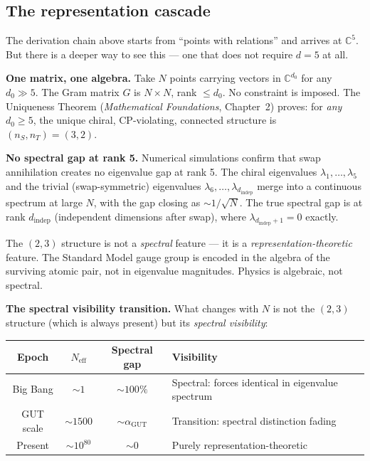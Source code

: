 \documentclass[12pt]{article}
\theoremstyle{remark}
\theoremstyle{definition}
\newcommand{\CC}{\mathbb{C}}
\begin{document}
\subsection{The representation cascade}

The derivation chain above starts from ``points with relations'' and arrives at $\CC^5$. But there is a deeper way to see this --- one that does not require $d = 5$ at all.

\textbf{One matrix, one algebra.} Take $N$ points carrying vectors in $\CC^{d_0}$ for any $d_0 \gg 5$. The Gram matrix $G$ is $N \times N$, rank $\leq d_0$. No constraint is imposed. The Uniqueness Theorem (\textit{Mathematical Foundations}, Chapter~2) proves: for \emph{any} $d_0 \geq 5$, the unique chiral, CP-violating, connected structure is $(n_S, n_T) = (3, 2)$.

\textbf{No spectral gap at rank 5.} Numerical simulations confirm that swap annihilation creates no eigenvalue gap at rank 5. The chiral eigenvalues $\lambda_1, \ldots, \lambda_5$ and the trivial (swap-symmetric) eigenvalues $\lambda_6, \ldots, \lambda_{d_\text{indep}}$ merge into a continuous spectrum at large $N$, with the gap closing as $\sim 1/\sqrt{N}$. The true spectral gap is at rank $d_\text{indep}$ (independent dimensions after swap), where $\lambda_{d_\text{indep}+1} = 0$ exactly.

The $(2,3)$ structure is not a \emph{spectral} feature --- it is a \emph{representation-theoretic} feature. The Standard Model gauge group is encoded in the algebra of the surviving atomic pair, not in eigenvalue magnitudes. Physics is algebraic, not spectral.

\textbf{The spectral visibility transition.} What changes with $N$ is not the $(2,3)$ structure (which is always present) but its \emph{spectral visibility}:

\begin{center}
\begin{tabular}{cccl}
\hline
Epoch & $N_\text{eff}$ & Spectral gap & Visibility \\
\hline
Big Bang & $\sim 1$ & $\sim 100\%$ & Spectral: forces identical in eigenvalue spectrum \\
GUT scale & $\sim 1500$ & $\sim \alpha_\text{GUT}$ & Transition: spectral distinction fading \\
Present & $\sim 10^{80}$ & $\sim 0$ & Purely representation-theoretic \\
\hline
\end{tabular}
\end{center}
\end{document}
